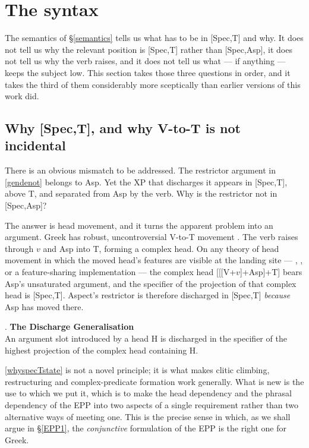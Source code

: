 \documentclass[11pt]{article}
\begin{document}
\section{The syntax}\label{syntax}

The semantics of \S\ref{semantics} tells us what has to be in [Spec,T] and why.  It does not tell us why the relevant position is [Spec,T] rather than [Spec,Asp], it does not tell us why the verb raises, and it does not tell us what --- if anything --- keeps the subject low.  This section takes those three questions in order, and it takes the third of them considerably more sceptically than earlier versions of this work did.

\subsection{Why [Spec,T], and why V-to-T is not incidental}\label{whyspecT}

There is an obvious mismatch to be addressed.  The restrictor argument in \ref{gendenot} belongs to Asp.  Yet the XP that discharges it appears in [Spec,T], above T, and separated from Asp by the verb.  Why is the restrictor not in [Spec,Asp]?

The answer is head movement, and it turns the apparent problem into an argument.  Greek has robust, uncontroversial V-to-T movement \citep{alexiadou-anagnostopoulou:98, philippaki:85}.  The verb raises through $v$ and Asp into T, forming a complex head.  On any theory of head movement in which the moved head's features are visible at the landing site --- \citet{matushansky:06}, \citet{roberts:10hm}, or a feature-sharing implementation --- the complex head [[[V+$v$]+Asp]+T] bears Asp's unsaturated argument, and the specifier of the projection of that complex head is [Spec,T].  Aspect's restrictor is therefore discharged in [Spec,T] \emph{because} Asp has moved there.

\ex. \label{whyspecTstate}
\textbf{The Discharge Generalisation}\\
An argument slot introduced by a head H is discharged in the specifier of the highest projection of the complex head containing H.

\medskip
\ref{whyspecTstate} is not a novel principle; it is what makes clitic climbing, restructuring and complex-predicate formation work generally.  What is new is the use to which we put it, which is to make the head dependency and the phrasal dependency of the EPP into two aspects of a single requirement rather than two alternative ways of meeting one.  This is the precise sense in which, as we shall argue in \S\ref{EPP1}, the \emph{conjunctive} formulation of the EPP is the right one for Greek.
\end{document}
